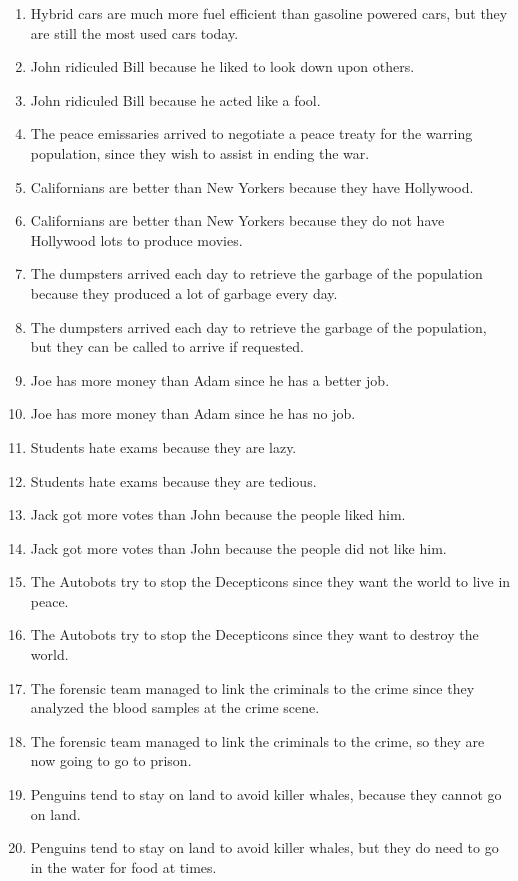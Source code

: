 \documentclass{article}
\begin{document}
\begin{enumerate}
	\item Hybrid cars are much more fuel efficient than gasoline powered cars, but they are still the most used cars today.
	\item John ridiculed Bill because he liked to look down upon others.
	\item John ridiculed Bill because he acted like a fool.
	\item The peace emissaries arrived to negotiate a peace treaty for the warring population, since they wish to assist in ending the war.
	\item Californians are better than New Yorkers because they have Hollywood.
	\item Californians are better than New Yorkers because they do not have Hollywood lots to produce movies.
	\item The dumpsters arrived each day to retrieve the garbage of the population because they produced a lot of garbage every day.
	\item The dumpsters arrived each day to retrieve the garbage of the population, but they can be called to arrive if requested.
	\item Joe has more money than Adam since he has a better job.
	\item Joe has more money than Adam since he has no job.
	\item Students hate exams because they are lazy.
	\item Students hate exams because they are tedious.
	\item Jack got more votes than John because the people liked him.
	\item Jack got more votes than John because the people did not like him.
	\item The Autobots try to stop the Decepticons since they want the world to live in peace.
	\item The Autobots try to stop the Decepticons since they want to destroy the world.
	\item The forensic team managed to link the criminals to the crime since they analyzed the blood samples at the crime scene.
	\item The forensic team managed to link the criminals to the crime, so they are now going to go to prison.
	\item Penguins tend to stay on land to avoid killer whales, because they cannot go on land.
	\item Penguins tend to stay on land to avoid killer whales, but they do need to go in the water for food at times.

\end{enumerate}
\end{document}

